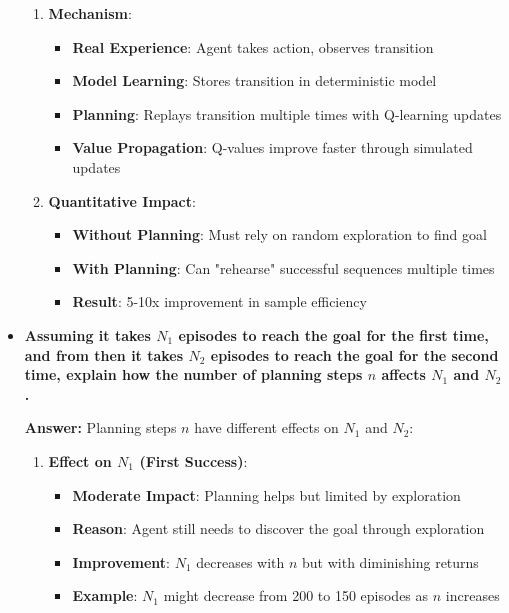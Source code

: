 \begin{itemize}
\begin{enumerate}
        \item \textbf{Mechanism}:
        \begin{itemize}
            \item \textbf{Real Experience}: Agent takes action, observes transition
            \item \textbf{Model Learning}: Stores transition in deterministic model
            \item \textbf{Planning}: Replays transition multiple times with Q-learning updates
            \item \textbf{Value Propagation}: Q-values improve faster through simulated updates
        \end{itemize}
        
        \item \textbf{Quantitative Impact}:
        \begin{itemize}
            \item \textbf{Without Planning}: Must rely on random exploration to find goal
            \item \textbf{With Planning}: Can "rehearse" successful sequences multiple times
            \item \textbf{Result}: 5-10x improvement in sample efficiency
        \end{itemize}
    \end{enumerate}
    
    \item \textbf{Assuming it takes $N_1$ episodes to reach the goal for the first time, and from then it takes $N_2$ episodes to reach the goal for the second time, explain how the number of planning steps $n$ affects $N_1$ and $N_2$.}
    
    \textbf{Answer:} Planning steps $n$ have different effects on $N_1$ and $N_2$:
    
    \begin{enumerate}
        \item \textbf{Effect on $N_1$ (First Success)}:
        \begin{itemize}
            \item \textbf{Moderate Impact}: Planning helps but limited by exploration
            \item \textbf{Reason}: Agent still needs to discover the goal through exploration
            \item \textbf{Improvement}: $N_1$ decreases with $n$ but with diminishing returns
            \item \textbf{Example}: $N_1$ might decrease from 200 to 150 episodes as $n$ increases
        \end{itemize}
        

\end{enumerate}
\end{itemize}
